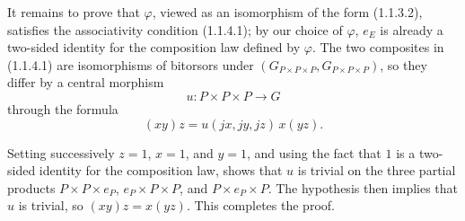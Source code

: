 It remains to prove that $\varphi$, viewed as an isomorphism of the form
(1.1.3.2), satisfies the associativity condition (1.1.4.1); by our
choice of $\varphi$, $e_E$ is already a two-sided identity for the
composition law defined by $\varphi$. The two composites in (1.1.4.1)
are isomorphisms of bitorsors under
$(G_{P\times P\times P},G_{P\times P\times P})$, so they differ by a
central morphism
\begin{equation*}
 u:P\times P\times P\longrightarrow G
\end{equation*}
through the formula
\begin{equation*}
 (xy)z=u(jx,jy,jz)\,x(yz).
\end{equation*}


Setting successively $z=1$, $x=1$, and $y=1$, and using the fact that
$1$ is a two-sided identity for the composition law, shows that $u$ is
trivial on the three partial products $P\times P\times e_P$,
$e_P\times P\times P$, and $P\times e_P\times P$. The hypothesis then
implies that $u$ is trivial, so $(xy)z=x(yz)$. This completes the proof.

